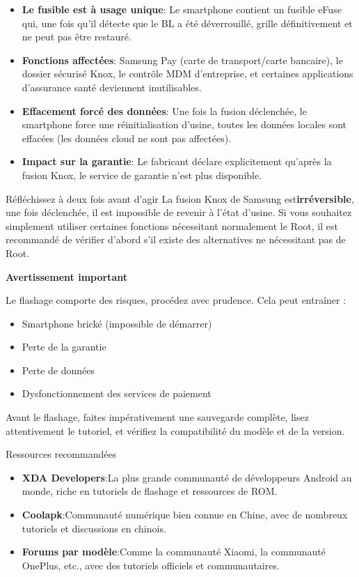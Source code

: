 \begin{itemize}
  \item \textbf{Le fusible est à usage unique}: Le smartphone contient un fusible eFuse qui, une fois qu'il détecte que le BL a été déverrouillé, grille définitivement et ne peut pas être restauré.
  \item \textbf{Fonctions affectées}: Samsung Pay (carte de transport/carte bancaire), le dossier sécurisé Knox, le contrôle MDM d'entreprise, et certaines applications d'assurance santé deviennent inutilisables.
  \item \textbf{Effacement forcé des données}: Une fois la fusion déclenchée, le smartphone force une réinitialisation d'usine, toutes les données locales sont effacées (les données cloud ne sont pas affectées).
  \item \textbf{Impact sur la garantie}: Le fabricant déclare explicitement qu'après la fusion Knox, le service de garantie n'est plus disponible.
\end{itemize}

\begin{tcbwarn}{Réfléchissez à deux fois avant d'agir}
La fusion Knox de Samsung est\textbf{irréversible}, une fois déclenchée, il est impossible de revenir à l'état d'usine. Si vous souhaitez simplement utiliser certaines fonctions nécessitant normalement le Root, il est recommandé de vérifier d'abord s'il existe des alternatives ne nécessitant pas de Root.

\end{tcbwarn}

\textbf{Avertissement important}\par

Le flashage comporte des risques, procédez avec prudence. Cela peut entraîner :

\begin{itemize}
  \item Smartphone brické (impossible de démarrer)
  \item Perte de la garantie
  \item Perte de données
  \item Dysfonctionnement des services de paiement
\end{itemize}

Avant le flashage, faites impérativement une sauvegarde complète, lisez attentivement le tutoriel, et vérifiez la compatibilité du modèle et de la version.

\begin{tcbinfo}{Ressources recommandées}
\begin{itemize}
  \item \textbf{XDA Developers}:La plus grande communauté de développeurs Android au monde, riche en tutoriels de flashage et ressources de ROM.
  \item \textbf{Coolapk}:Communauté numérique bien connue en Chine, avec de nombreux tutoriels et discussions en chinois.
  \item \textbf{Forums par modèle}:Comme la communauté Xiaomi, la communauté OnePlus, etc., avec des tutoriels officiels et communautaires.
\end{itemize}

\end{tcbinfo}

